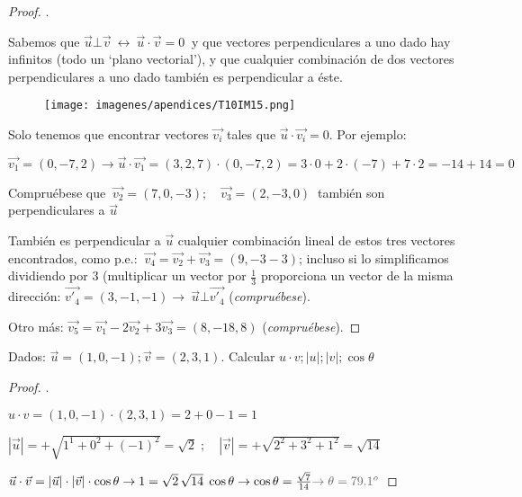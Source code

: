 \begin{proof}\renewcommand{\qedsymbol}{$\diamond$}.
	
	\begin{multicols}{2}
	Sabemos que  
	$  \vec u \bot \vec v \ \leftrightarrow \ \vec u \cdot \vec v=0 \ $
	y que vectores perpendiculares a uno dado hay infinitos (todo un `plano vectorial'), y que cualquier combinación de dos vectores perpendiculares a uno dado también es perpendicular a éste.
	\begin{figure}[H]
	\centering
	\texttt{[image: imagenes/apendices/T10IM15.png]}
	\end{figure}	
	\end{multicols}	
	Solo tenemos que encontrar vectores $\vec {v_i}$ tales que $\vec u \cdot \vec {v_i}=0$. Por ejemplo:
	
	$\vec {v_1} = (0,-7,2) \to \vec u \cdot \vec {v_1}=(3,2,7)\cdot (0,-7,2)=3 \cdot 0 + 2 \cdot (-7) + 7 \cdot 2 =-14+14=0$
	
	Compruébese que $\ \vec {v_2} = (7,0,-3);  \quad \vec {v_3} = (2,-3,0) \ $ también son perpendiculares a $\vec u$
	
	También es perpendicular a $\vec u$ cualquier combinación lineal de estos tres vectores encontrados, como p.e.:
	$\ \vec {v_4}  = \vec {v_2}+\vec {v_3}= (9,-3-3)$; incluso si lo simplificamos dividiendo por 3 (multiplicar un vector por $\frac 1 3 $  proporciona un vector de la misma dirección: $\vec {v'_4}=(3,-1,-1) \to   \ \vec u \bot \vec {v'_4} $ (\emph{compruébese}).
	
	Otro más: $\vec {v_5}=\vec {v_1} - 2 \vec {v_2}+ 3\vec {v_3}= (8,-18,8)$ (\emph{compruébese}).
\end{proof}


\begin{ejre}

	Dados:  $\vec u=(1,0,-1); \vec v=(2,3,1)$. Calcular $u \cdot v; |u|; |v|; \cos \theta $
\end{ejre}


\begin{proof}\renewcommand{\qedsymbol}{$\diamond$}
.

$u \cdot v = (1,0,-1) \cdot (2,3,1)=2+0-1=1$

$|\vec u|=+\sqrt{1^1+0^2+(-1)^2}=\sqrt{2}\; ; \quad |\vec v|=+\sqrt{2^2+3^2+1^2}=\sqrt{14}$

$\vec u \cdot \vec v = |\vec u|\cdot |\vec v| \cdot \cos \theta \to 
1=\sqrt 2 \, \sqrt{14} \; \cos \theta \to \cos \theta = \frac {\sqrt{7}}{14} \textcolor{gris}{\to \theta=79.1^o}  $

	
\end{proof}


